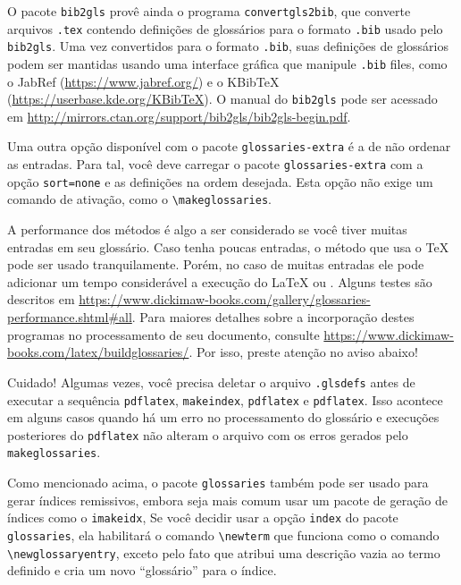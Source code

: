 O pacote \texttt{bib2gls}  provê ainda o programa \texttt{convertgls2bib}, que converte arquivos \texttt{.tex} contendo definições de glossários para o formato \texttt{.bib} usado pelo \texttt{bib2gls}. Uma vez convertidos para o formato \texttt{.bib}, suas definições de glossários podem ser mantidas usando uma interface gráfica que manipule \texttt{.bib} files, como o JabRef (\url{https://www.jabref.org/}) e o KBibTeX (\url{https://userbase.kde.org/KBibTeX}). O manual do \texttt{bib2gls} pode ser acessado em  \url{http://mirrors.ctan.org/support/bib2gls/bib2gls-begin.pdf}.

Uma outra opção disponível com o pacote \texttt{glossaries-extra} é a de não ordenar as entradas. Para tal, você deve carregar o pacote \texttt{glossaries-extra} com a opção \texttt{sort=none} e as definições na ordem desejada. Esta opção não exige um comando de ativação, como o \texttt{\textbackslash{}makeglossaries}.

A performance dos métodos é algo a ser considerado se você tiver muitas entradas em seu glossário. Caso tenha poucas entradas, o método que usa o \TeX{} pode ser usado tranquilamente. Porém, no caso de muitas entradas ele pode adicionar um tempo considerável a execução do \LaTeX{} ou . Alguns testes são descritos em 
\url{https://www.dickimaw-books.com/gallery/glossaries-performance.shtml#all}. Para maiores detalhes sobre a incorporação destes programas no processamento de seu documento, consulte \url{https://www.dickimaw-books.com/latex/buildglossaries/}. Por isso, preste atenção no aviso abaixo!

\begin{bclogo}[
	couleur=bgblue,
	arrondi=0,
	logo=\faWarning,
	barre=none,
	noborder=true]{Cuidado!}
	Algumas vezes, você precisa deletar o arquivo \texttt{.glsdefs} antes de executar a sequência \texttt{pdflatex}, \texttt{makeindex}, \texttt{pdflatex} e \texttt{pdflatex}. Isso acontece em alguns casos quando há um erro no processamento do glossário e execuções posteriores do \texttt{pdflatex} não alteram o arquivo com os erros gerados pelo \texttt{makeglossaries}.
\end{bclogo}

Como mencionado acima, o pacote \texttt{glossaries} também pode ser usado para gerar índices remissivos, embora seja mais comum usar um pacote de geração de índices como o  \texttt{imakeidx}, Se você decidir usar a opção \texttt{index} do pacote \texttt{glossaries}, ela habilitará o comando \texttt{\textbackslash{}newterm} que funciona como o comando \texttt{\textbackslash{}newglossaryentry}, exceto pelo fato que atribui uma descrição vazia ao termo definido e cria um novo ``glossário'' para o índice.


